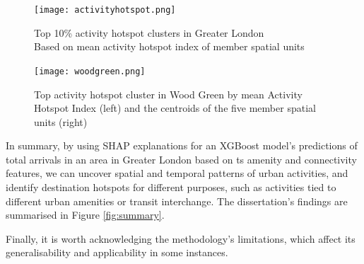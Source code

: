 \begin{figure}
    \centering
    \texttt{[image: activityhotspot.png]}
    \captionsetup{justification=centering}
    \caption{Top 10\% activity hotspot clusters in Greater London\\Based on mean activity hotspot index of member spatial units}
    \label{fig:activityhotpost}
\end{figure}

\begin{figure}[!hbt]
    \centering
    \texttt{[image: woodgreen.png]}
    \captionsetup{justification=centering}
    \caption{Top activity hotspot cluster in Wood Green by mean Activity Hotspot Index (left) and the centroids of the five member spatial units (right)}
    \label{fig:woodgreen}
\end{figure}

In summary, by using SHAP explanations for an XGBoost model's predictions of total arrivals in an area in Greater London based on ts amenity and connectivity features, we can uncover spatial and temporal patterns of urban activities, and identify destination hotspots for different purposes, such as activities tied to different urban amenities or transit interchange. The dissertation's findings are summarised in Figure \ref{fig:summary}.

\pagebreak
Finally, it is worth acknowledging the methodology's limitations, which affect its generalisability and applicability in some instances.

